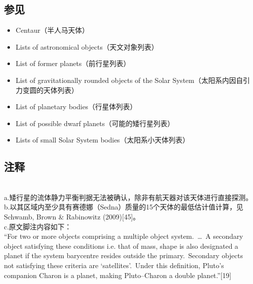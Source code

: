 \subsection{参见}
\begin{itemize}
\item Centaur（半人马天体）\\
\item Lists of astronomical objects（天文对象列表）\\
\item List of former planets（前行星列表）\\
\item List of gravitationally rounded objects of the Solar System（太阳系内因自引力变圆的天体列表）\\
\item List of planetary bodies（行星体列表）\\
\item List of possible dwarf planets（可能的矮行星列表）\\
\item Lists of small Solar System bodies（太阳系小天体列表）
\end{itemize}
\subsection{注释}\\
a.矮行星的流体静力平衡判据无法被确认，除非有航天器对该天体进行直接探测。\\
b.以其区域内至少具有赛德娜（Sedna）质量的15个天体的最低估计值计算，见 Schwamb, Brown \& Rabinowitz (2009)[45]。\\
c.原文脚注内容如下：\\
“For two or more objects comprising a multiple object system.~…~A secondary object satisfying these conditions i.e. that of mass, shape is also designated a planet if the system barycentre resides outside the primary.~Secondary objects not satisfying these criteria are ‘satellites’.~Under this definition, Pluto’s companion Charon is a planet, making Pluto–Charon a double planet.”[19]




